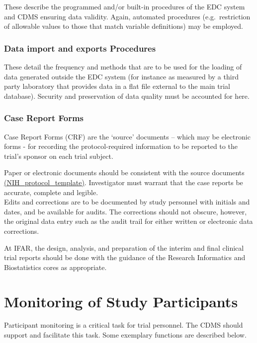 \documentclass[]{book}
\theoremstyle{definition}
\theoremstyle{definition}
\theoremstyle{definition}
\theoremstyle{remark}
\begin{document}
These describe the programmed and/or built-in procedures of the EDC
system and CDMS ensuring data validity. Again, automated procedures
(e.g.~restriction of allowable values to those that match variable
definitions) may be employed.

\subsubsection{Data import and exports
Procedures}\label{data-import-and-exports-procedures}

These detail the frequency and methods that are to be used for the
loading of data generated outside the EDC system (for instance as
measured by a third party laboratory that provides data in a flat file
external to the main trial database). Security and preservation of data
quality must be accounted for here.

\subsubsection{Case Report Forms}\label{case-report-forms}

Case Report Forms (CRF) are the `source' documents -- which may be
electronic forms - for recording the protocol-required information to be
reported to the trial's sponsor on each trial subject.

Paper or electronic documents should be consistent with the source
documents
\href{http://osp.od.nih.gov/sites/default/files/Protocol_Template_05Feb2016_508.pdf}{(NIH\_protocol\_template)}.
Investigator must warrant that the case reports be accurate, complete
and legible.\\[2\baselineskip]Edits and corrections are to be documented
by study personnel with initials and dates, and be available for audits.
The corrections should not obscure, however, the original data entry
such as the audit trail for either written or electronic data
corrections.

At IFAR, the design, analysis, and preparation of the interim and final
clinical trial reports should be done with the guidance of the Research
Informatics and Biostatistics cores as appropriate.

\section{Monitoring of Study
Participants}\label{monitoring-of-study-participants}

Participant monitoring is a critical task for trial personnel. The CDMS
should support and facilitate this task. Some exemplary functions are
described below.
\end{document}
